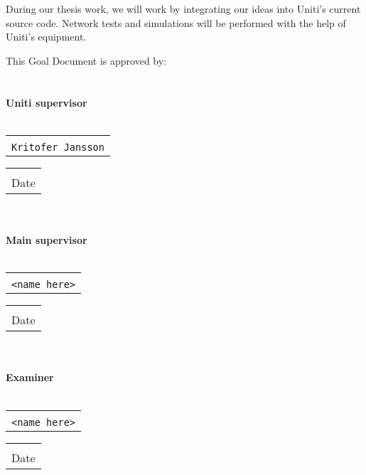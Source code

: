 \documentclass[a4paper]{article}
\makeatletter
\newcommand{\signature}[2]{%
	\noindent%
	\textbf{{#1}}\\\\
	\begin{tabular}{@{}p{2.5in}@{}}
		\\ \hline \\[-.75\normalbaselineskip]
		\texttt{{#2}}
	\end{tabular} \hspace{0in}
	\begin{tabular}{@{}p{2.5in}@{}}
		\\ \hline \\[-.75\normalbaselineskip]
		Date
	\end{tabular}\\
}
\makeatother
\begin{document}
During our thesis work, we will work by integrating our ideas into Uniti's
current source code.
Network tests and simulations will be performed with the help of Uniti's
equipment.



{}


\pagebreak
This Goal Document is approved by:\\\\\\

\signature{Uniti supervisor}{Kritofer Jansson}\\

\signature{Main supervisor}{<name here>}\\

\signature{Examiner}{<name here>}
\end{document}

